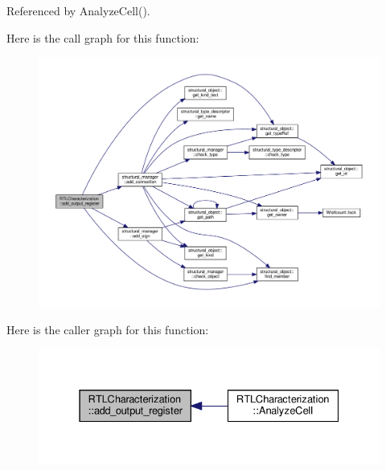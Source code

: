 Referenced by Analyze\+Cell().

Here is the call graph for this function\+:
\nopagebreak
\begin{figure}[H]
\begin{center}
\leavevmode
\includegraphics[width=350pt]{d9/d84/classRTLCharacterization_a8da7aeea42687af7ad61a61574874de1_cgraph}
\end{center}
\end{figure}
Here is the caller graph for this function\+:
\nopagebreak
\begin{figure}[H]
\begin{center}
\leavevmode
\includegraphics[width=331pt]{d9/d84/classRTLCharacterization_a8da7aeea42687af7ad61a61574874de1_icgraph}
\end{center}
\end{figure}
\mbox{\label{classRTLCharacterization_a61ddc1e36acd32ca894f84303206ff47}} 
